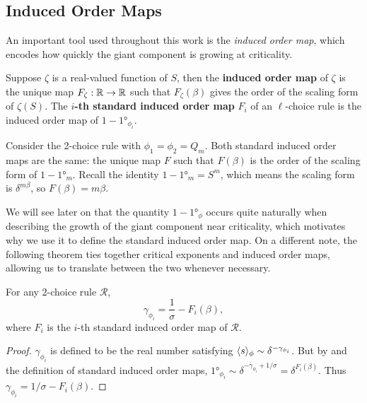 \documentclass[twoside,10pt]{article}
\begin{document}
\subsection{Induced Order Maps}

An important tool used throughout this work is the \emph{induced order map}, which encodes how quickly the giant component is growing at criticality.

\begin{defn}[]
	Suppose $\zeta$ is a real-valued function of $S$, then the \textbf{induced order map} of $\zeta$ is the unique map $F_{\zeta}:\mathbb{R}\to \mathbb{R}$ such that $F_{\zeta}(\beta)$ gives the order of the scaling form of $\zeta(S)$. The \textbf{$i$-th standard induced order map} $F_{i}$ of an $\ell$-choice rule is the induced order map of $1 - \ang{1}_{\phi_{i}}$.
\end{defn}

\begin{ex}[]
	Consider the 2-choice rule with $\phi_1 = \phi_2 = Q_{m}$. Both standard induced order maps are the same: the unique map $F$ such that $F(\beta)$ is the order of the scaling form of $1 - \ang{1}_{m}$. Recall the identity $1-\ang{1}_{m}= S^{m}$, which means the scaling form is $\delta^{m \beta}$, so $F(\beta) = m\beta$.
\end{ex}

We will see later on that the quantity $1-\ang{1}_{\phi}$ occurs quite naturally when describing the growth of the giant component near criticality, which motivates why we use it to define the standard induced order map. On a different note, the following theorem ties together critical exponents and induced order maps, allowing us to translate between the two whenever necessary.

\begin{prop}
	\label{exponent-to-induced-map}
	For any 2-choice rule $\mathcal{R}$,
	\[
		\gamma_{\phi_{i}} = \frac{1}{\sigma} - F_{i}(\beta),
	\] where $F_{i}$ is the $i$-th standard induced order map of $\mathcal{R}$.
\end{prop}
\begin{proof}
	$\gamma_{\phi_i}$ is defined to be the real number satisfying $\langle s \rangle_{\phi} \sim \delta^{-\gamma_{\phi_i}}$. But by  and the definition of standard induced order maps, $\ang{1}_{\phi_{i}} \sim \delta^{-\gamma_{\phi_i}+1/\sigma} = \delta^{F_{i}(\beta)}$. Thus $\gamma_{\phi_i} = 1/\sigma - F_{i}(\beta)$.
\end{proof}
\end{document}

